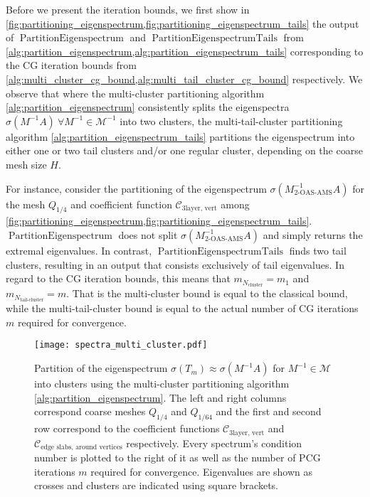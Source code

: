 Before we present the iteration bounds, we first show in \cref{fig:partitioning_eigenspectrum,fig:partitioning_eigenspectrum_tails} the output of \newline$\operatorname{PartitionEigenspectrum}$ and $\operatorname{PartitionEigenspectrumTails}$ from \cref{alg:partition_eigenspectrum,alg:partition_eigenspectrum_tails} corresponding to the CG iteration bounds from \cref{alg:multi_cluster_cg_bound,alg:multi_tail_cluster_cg_bound} respectively. We observe that where the multi-cluster partitioning algorithm \cref{alg:partition_eigenspectrum} consistently splits the eigenspectra $\sigma(M^{-1}A) \ \forall M^{-1} \in\mathcal{M}^{-1}$ into two clusters, the multi-tail-cluster partitioning algorithm \cref{alg:partition_eigenspectrum_tails} partitions the eigenspectrum into either one or two tail clusters and/or one regular cluster, depending on the coarse mesh size $H$. 

For instance, consider the partitioning of the eigenspectrum $\sigma(M_{\text{2-OAS-AMS}}^{-1}A)$ for the mesh $Q_{1/4}$ and coefficient function $\mathcal{C}_{\text{3layer, vert}}$ among \cref{fig:partitioning_eigenspectrum,fig:partitioning_eigenspectrum_tails}. $\operatorname{PartitionEigenspectrum}$ does not split $\sigma(M_{\text{2-OAS-AMS}}^{-1}A)$ and simply returns the extremal eigenvalues. In contrast, $\operatorname{PartitionEigenspectrumTails}$ finds two tail clusters, resulting in an output that consists exclusively of tail eigenvalues. In regard to the CG iteration bounds, this means that $m_{N_{\text{cluster}}} = m_1$ and $m_{N_{\text{tail-cluster}}} = m$. That is the multi-cluster bound is equal to the classical bound, while the multi-tail-cluster bound is equal to the actual number of CG iterations $m$ required for convergence.
\begin{figure}[H]
    \centering
    \texttt{[image: spectra\_multi\_cluster.pdf]}
    \caption{Partition of the eigenspectrum $\sigma(T_m)\approx\sigma(M^{-1}A)$ for $M^{-1}\in\mathcal{M}$ into clusters using the multi-cluster partitioning algorithm \cref{alg:partition_eigenspectrum}. The left and right columns correspond coarse meshes $Q_{1/4}$ and $Q_{1/64}$ and the first and second row correspond to the coefficient functions $\mathcal{C}_{\text{3layer, vert}}$ and $\mathcal{C}_{\text{edge slabs, around vertices}}$ respectively. Every spectrum's condition number is plotted to the right of it as well as the number of PCG iterations $m$ required for convergence. Eigenvalues are shown as crosses and clusters are indicated using square brackets.}
    \label{fig:partitioning_eigenspectrum}
\end{figure}

